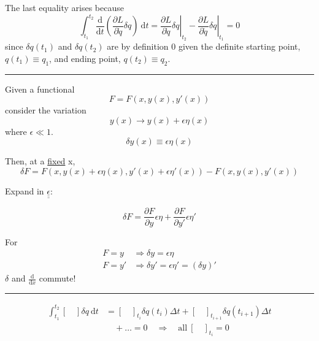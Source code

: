 \documentclass{article}
\begin{document}
\noindent The last equality arises because
\begin{equation*}
    \int_{t_1}^{t_2} \dfrac{ \mathrm{d} }{ \mathrm{d} t } \left( \dfrac{ \partial L }{ \partial \dot{q} } \delta q \right) ~\mathrm{d}t = \left. \dfrac{ \partial L }{ \partial \dot{q} } \delta q \right|_{t_2} - \left. \dfrac{ \partial L }{ \partial \dot{q} } \delta q \right|_{t_1} = 0
\end{equation*}
since $ \delta q (t_1) $ and $ \delta q (t_2) $ are by definition 0 given the definite starting point, $ q (t_1) \equiv q_1 $, and ending point, $ q (t_2) \equiv q_2 $.


\noindent\rule{\textwidth}{.5pt}

\noindent Given a functional
\begin{equation*}
    F = F \left( x, y(x), y'(x) \right)
\end{equation*}
consider the variation
\begin{equation*}
    y(x) \longrightarrow y(x) + \epsilon \eta (x)
\end{equation*}
where $ \epsilon \ll 1 $.
\begin{equation*}
    \delta y(x) \equiv \epsilon \eta (x)
\end{equation*}

\noindent Then, at a \underline{fixed} x,
\begin{equation*}
    \delta F = F \left( x, y(x) + \epsilon \eta (x), y'(x) + \epsilon \eta' (x) \right) - F \left( x, y(x), y'(x) \right)
\end{equation*}

\noindent Expand in $\underline{\underline{\epsilon}}$:

\begin{equation*}
    \delta F = \dfrac{ \partial F }{ \partial y } \epsilon \eta + \dfrac{ \partial F }{ \partial y' } \epsilon \eta'
\end{equation*}

\noindent For
\begin{align*}
    F = y &\Longrightarrow \delta y = \epsilon \eta \\
    F = y' &\Longrightarrow \delta y' = \epsilon \eta' = {\left( \delta y \right)}'
\end{align*}
$\delta$ and $\tfrac{\mathrm{d}}{ \mathrm{d} x }$ commute!

\noindent\rule{\textwidth}{.5pt}


\begin{equation*}
    \begin{split}
        \int_{t_1}^{t_2} \left[ \quad \right] \delta q ~\mathrm{d}t &= {\left[ \quad \right]}_{t_i} \delta q (t_i) \Delta t + {\left[ \quad \right]}_{t_{i+1}} \delta q (t_{i+1}) \Delta t \\
        &\quad + \dots = 0 \quad \Longrightarrow \quad \mathrm{all}~ {\left[ \quad \right]}_{t_i} = 0
    \end{split}
\end{equation*}
\end{document}
